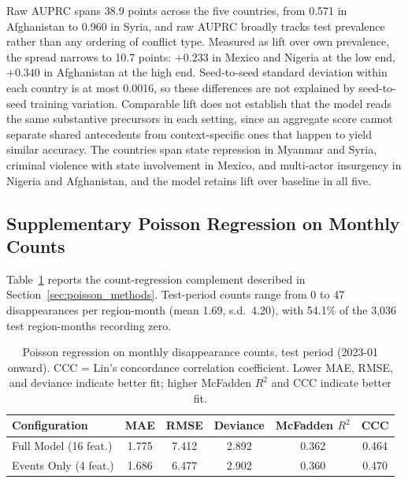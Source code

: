 \documentclass[pdflatex,sn-mathphys-num]{sn-jnl}%
\theoremstyle{thmstyleone}%
\theoremstyle{thmstyletwo}%
\theoremstyle{thmstylethree}%
\begin{document}
Raw AUPRC spans 38.9 points across the five countries, from 0.571 in Afghanistan to 0.960 in Syria, and raw AUPRC broadly tracks test prevalence rather than any ordering of conflict type. Measured as lift over own prevalence, the spread narrows to 10.7 points: $+0.233$ in Mexico and Nigeria at the low end, $+0.340$ in Afghanistan at the high end. Seed-to-seed standard deviation within each country is at most 0.0016, so these differences are not explained by seed-to-seed training variation. Comparable lift does not establish that the model reads the same substantive precursors in each setting, since an aggregate score cannot separate shared antecedents from context-specific ones that happen to yield similar accuracy. The countries span state repression in Myanmar and Syria, criminal violence with state involvement in Mexico, and multi-actor insurgency in Nigeria and Afghanistan, and the model retains lift over baseline in all five.

\subsection{Supplementary Poisson Regression on Monthly Counts}\label{sec:poisson_results}

Table~\ref{tab:poisson} reports the count-regression complement described in Section~\ref{sec:poisson_methods}. Test-period counts range from 0 to 47 disappearances per region-month (mean 1.69, s.d.\ 4.20), with 54.1\% of the 3,036 test region-months recording zero.

\begin{table}[h]
\centering
\caption{Poisson regression on monthly disappearance counts, test period (2023-01 onward). CCC = Lin's concordance correlation coefficient. Lower MAE, RMSE, and deviance indicate better fit; higher McFadden $R^2$ and CCC indicate better fit.}
\label{tab:poisson}
\small
\begin{tabular}{lccccc}
\toprule
\textbf{Configuration} & \textbf{MAE} & \textbf{RMSE} & \textbf{Deviance} & \textbf{McFadden $R^2$} & \textbf{CCC} \\
\midrule
Full Model (16 feat.) & 1.775 & 7.412 & 2.892 & 0.362 & 0.464 \\
Events Only (4 feat.) & 1.686 & 6.477 & 2.902 & 0.360 & 0.470 \\
\bottomrule
\end{tabular}
\end{table}
\end{document}
